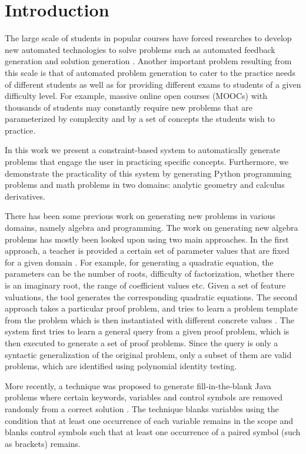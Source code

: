 \section{Introduction} \label{sec:intro}

The large scale of students in popular courses have forced researches to develop new automated technologies to solve problems such as automated feedback generation \cite{autograder} and solution generation \cite{geometry}. Another important problem resulting from this scale is that of automated problem generation to cater to the practice needs of different students as well as for providing different exams to students of a given difficulty level. For example, massive online open courses (MOOCs) with thousands of students may constantly require new problems that are parameterized by complexity and by a set of concepts the students wish to practice.

In this work we present a constraint-based system to automatically generate problems that engage the user in practicing specific concepts. Furthermore, we demonstrate the practicality of this system by generating Python programming problems and math problems in two domains: analytic geometry and calculus derivatives. 

There has been some previous work on generating new problems in various domains, namely algebra and programming. The work on generating new algebra problems has mostly been looked upon using two main approaches. In the first approach, a teacher is provided a certain set of parameter values that are fixed for a given domain \cite{jurkovic}. For example, for generating a quadratic equation, the parameters can be the number of roots, difficulty of factorization, whether there is an imaginary root, the range of coefficient values etc. Given a set of feature valuations, the tool generates the corresponding quadratic equations. The second approach takes a particular proof problem, and tries to learn a problem template from the problem which is then instantiated with different concrete values \cite{algebra}. The system first tries to learn a general query from a given proof problem, which is then executed to generate a set of proof problems. Since the query is only a syntactic generalization of the original problem, only a subset of them are valid problems, which are identified using polynomial identity testing. 

More recently, a technique was proposed to generate fill-in-the-blank Java problems where certain keywords, variables and control symbols are removed randomly from a correct solution \cite{javablanks}. The technique blanks variables using the condition that at least one occurrence of each variable remains in the scope and blanks control symbols such that at least one occurrence of a paired symbol (such as brackets) remains. 

